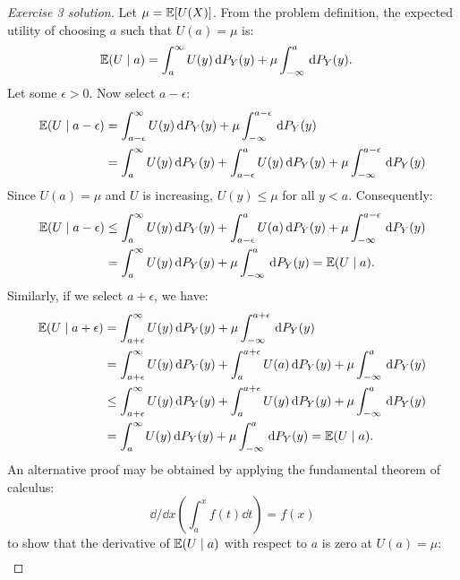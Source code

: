 \documentclass[twoside,a4paper]{article}
\begin{document}
\if{}
\begin{proof}[Exercise 3 solution]
  Let $\mu = \mathop{\mbox{\ensuremath{\mathbb{E}}}}\nolimits[U(X)]$.  From the problem definition, the expected
  utility of choosing $a$ such that $U(a) = \mu$ is:
  \begin{align*}
    \mathop{\mbox{\ensuremath{\mathbb{E}}}}\nolimits(U \mid a)
    & = 
    \int_a^\infty U(y) \, \mathrm{d}{P_Y}(y) 
    + 
    \mu \int_{-\infty}^a \, \mathrm{d}{P_Y}(y).
  \end{align*}
  Let some $\epsilon >
  0$. Now select $a - \epsilon$:
  \begin{align*}
    \mathop{\mbox{\ensuremath{\mathbb{E}}}}\nolimits(U \mid a - \epsilon)
    & = 
    \int_{a - \epsilon}^\infty U(y) \, \mathrm{d}{P_Y}(y) 
    +
    \mu \int_{-\infty}^{a-\epsilon} \, \mathrm{d}{P_Y}(y)
    \\
    & = 
    \int_a^\infty U(y) \, \mathrm{d}{P_Y}(y) 
    + 
    \int_{a-\epsilon}^a U(y) \, \mathrm{d}{P_Y}(y) 
    +
    \mu \int_{-\infty}^{a-\epsilon} \, \mathrm{d}{P_Y}(y)
  \end{align*}
  Since $U(a) = \mu$ and $U$ is increasing, $U(y) \leq
  \mu$ for all $y < a$. Consequently:
  \begin{align*}
    \mathop{\mbox{\ensuremath{\mathbb{E}}}}\nolimits(U \mid a - \epsilon)
    & \leq
    \int_a^\infty U(y) \, \mathrm{d}{P_Y}(y) 
    + 
    \int_{a-\epsilon}^a U(a) \, \mathrm{d}{P_Y}(y) 
    +
    \mu \int_{-\infty}^{a - \epsilon} \, \mathrm{d}{P_Y}(y)
    \\
    & =
    \int_a^\infty U(y) \, \mathrm{d}{P_Y}(y) 
    +
    \mu \int_{-\infty}^a \, \mathrm{d}{P_Y}(y)
    =
    \mathop{\mbox{\ensuremath{\mathbb{E}}}}\nolimits(U \mid a).
  \end{align*}
  Similarly, if we select $a + \epsilon$, we have:
  \begin{align*}
    \mathop{\mbox{\ensuremath{\mathbb{E}}}}\nolimits(U \mid a + \epsilon)
    & = 
    \int_{a+\epsilon} ^\infty U(y) \, \mathrm{d}{P_Y}(y) 
    +
    \mu \int_{-\infty}^{a + \epsilon} \, \mathrm{d}{P_Y}(y)
    \\
    & = 
    \int_{a+\epsilon} ^\infty U(y) \, \mathrm{d}{P_Y}(y) 
    +
    \int_{a}^{a + \epsilon} U(a) \, \mathrm{d}{P_Y}(y) 
    +
    \mu \int_{-\infty}^{a} \, \mathrm{d}{P_Y}(y)
    \\
    &\leq
    \int_{a+\epsilon} ^\infty U(y) \, \mathrm{d}{P_Y}(y) 
    +
    \int_{a}^{a + \epsilon} U(y) \, \mathrm{d}{P_Y}(y) 
    +
    \mu \int_{-\infty}^{a} \, \mathrm{d}{P_Y}(y)
    \\
    &=
    \int_{a} ^\infty U(y) \, \mathrm{d}{P_Y}(y) 
    +
    \mu \int_{-\infty}^{a} \, \mathrm{d}{P_Y}(y)
    = 
    \mathop{\mbox{\ensuremath{\mathbb{E}}}}\nolimits(U \mid a).
  \end{align*}
  An alternative proof may be obtained by applying the fundamental theorem of calculus:
  \[
  \dd/\dd x \left(\int_a^x f(t)\dd{t} \right)  = f(x)
  \]
  to show that the derivative of $\mathop{\mbox{\ensuremath{\mathbb{E}}}}\nolimits(U \mid a)$ with respect to $a$ is zero at $U(a) = \mu$:
  \begin{align*}

\end{align*}
\end{proof}
\end{document}

